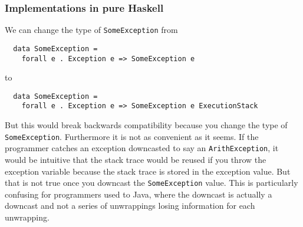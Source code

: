 \subsubsection{Implementations in pure Haskell}

We can change the type of \texttt{SomeException} from

\begin{verbatim}
  data SomeException =
    forall e . Exception e => SomeException e
\end{verbatim}

to

\begin{verbatim}
  data SomeException =
    forall e . Exception e => SomeException e ExecutionStack
\end{verbatim}

%
%


%
%


But this would break backwards compatibility because you change the type
of \texttt{SomeException}. Furthermore it is not as convenient as it
seems. If the programmer catches an exception downcasted to say an
\texttt{ArithException}, it would be intuitive that the stack trace
would be reused if you throw the exception variable because the stack
trace is stored in the exception value. But that is not true once you
downcast the \texttt{SomeException} value. This is particularly confusing for
programmers used to Java, where the downcast is actually a downcast and
not a series of unwrappings losing information for each unwrapping.


